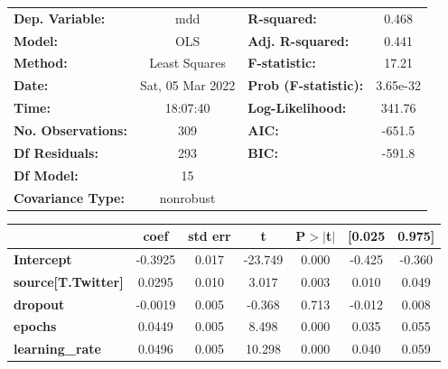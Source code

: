 \begin{center}
\begin{tabular}{lclc}
\toprule
\textbf{Dep. Variable:}              &       mdd        & \textbf{  R-squared:         } &     0.468   \\
\textbf{Model:}                      &       OLS        & \textbf{  Adj. R-squared:    } &     0.441   \\
\textbf{Method:}                     &  Least Squares   & \textbf{  F-statistic:       } &     17.21   \\
\textbf{Date:}                       & Sat, 05 Mar 2022 & \textbf{  Prob (F-statistic):} &  3.65e-32   \\
\textbf{Time:}                       &     18:07:40     & \textbf{  Log-Likelihood:    } &    341.76   \\
\textbf{No. Observations:}           &         309      & \textbf{  AIC:               } &    -651.5   \\
\textbf{Df Residuals:}               &         293      & \textbf{  BIC:               } &    -591.8   \\
\textbf{Df Model:}                   &          15      & \textbf{                     } &             \\
\textbf{Covariance Type:}            &    nonrobust     & \textbf{                     } &             \\
\bottomrule
\end{tabular}
\begin{tabular}{lcccccc}
                                     & \textbf{coef} & \textbf{std err} & \textbf{t} & \textbf{P$> |$t$|$} & \textbf{[0.025} & \textbf{0.975]}  \\
\midrule
\textbf{Intercept}                   &      -0.3925  &        0.017     &   -23.749  &         0.000        &       -0.425    &       -0.360     \\
\textbf{source[T.Twitter]}           &       0.0295  &        0.010     &     3.017  &         0.003        &        0.010    &        0.049     \\
\textbf{dropout}                     &      -0.0019  &        0.005     &    -0.368  &         0.713        &       -0.012    &        0.008     \\
\textbf{epochs}                      &       0.0449  &        0.005     &     8.498  &         0.000        &        0.035    &        0.055     \\
\textbf{learning\_rate}              &       0.0496  &        0.005     &    10.298  &         0.000        &        0.040    &        0.059     \\

\end{tabular}
\end{center}
